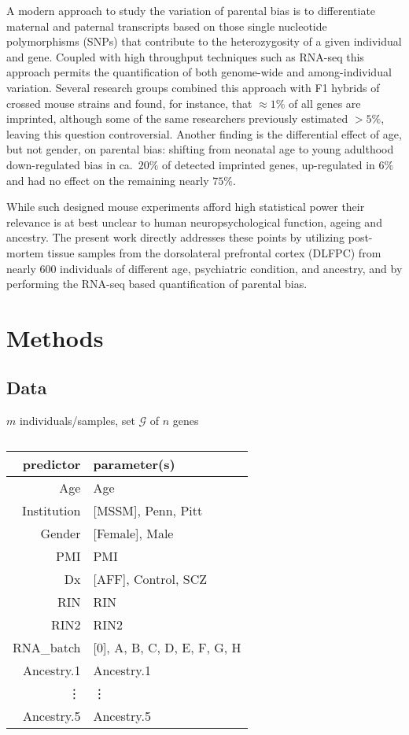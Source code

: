 \documentclass[letterpaper]{article}
\begin{document}
A modern approach to study the variation of parental bias is to differentiate
maternal and paternal transcripts based on those single nucleotide
polymorphisms (SNPs) that contribute to the heterozygosity of a given
individual and gene.  Coupled with high throughput techniques such as RNA-seq
this approach permits the quantification of both genome-wide and
among-individual variation.  Several research groups
\cite{Gregg2010a,Perez2015,DeVeale2012} combined this approach with F1 hybrids
of crossed mouse strains and found, for instance, that \(\approx 1\%\) of all
genes are imprinted, although some \cite{Perez2015} of the same researchers
previously estimated \(> 5\%\), leaving this question controversial.
Another finding is the differential effect of age, but not gender, on parental
bias: shifting from neonatal age to young adulthood down-regulated bias in
ca.~\(20\%\) of detected imprinted genes, up-regulated in \(6\%\) and had no
effect on the remaining nearly \(75\%\).

While such designed mouse experiments afford high statistical power their
relevance is at best unclear to human neuropsychological function, ageing and
ancestry.  The present work directly addresses these points by utilizing
post-mortem tissue samples from the dorsolateral prefrontal cortex (DLFPC)
from nearly 600 individuals of different age, psychiatric condition, and
ancestry, and by performing the RNA-seq based quantification of parental bias.

\section{Methods}

\subsection{Data}

\(m\) individuals/samples, set \(\mathcal{G}\) of \(n\) genes

\begin{table}
\begin{center}
\begin{tabular}{r|l}
predictor & parameter(s)\\
\hline
Age & Age\\
Institution & [MSSM], Penn, Pitt\\
Gender & [Female], Male\\
PMI & PMI\\
Dx & [AFF], Control, SCZ\\
RIN & RIN\\
RIN2 & RIN2\\
RNA\_batch & [0], A, B, C, D, E, F, G, H\\
Ancestry.1 & Ancestry.1\\
\vdots & \vdots \\
Ancestry.5 & Ancestry.5\\
\end{tabular}
\caption{}
\label{tab:predictors}
\end{center}
\end{table}
\end{document}
